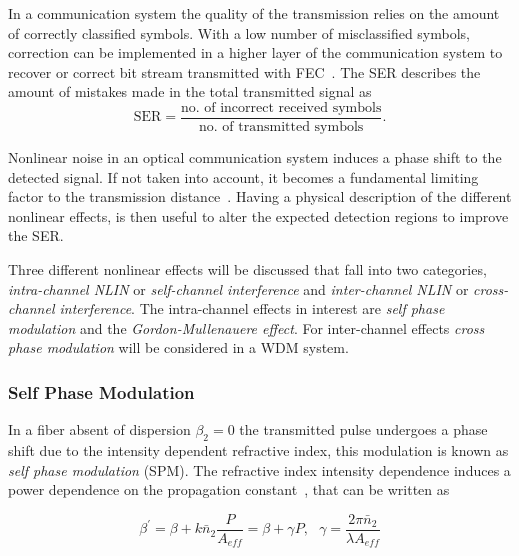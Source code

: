  In a communication system the quality of the transmission relies on the amount of correctly classified symbols. With a low number of misclassified symbols, correction can be implemented in a higher layer of the communication system to recover or correct bit stream transmitted with FEC~\cite{NLPNinCFO}. The SER describes the amount of mistakes made in the total transmitted signal as
 \begin{equation}
\text{SER} = \frac{\text{no. of incorrect received symbols}}{\text{no. of transmitted symbols}}.
\end{equation}

Nonlinear noise in an optical communication system induces a phase shift to the detected signal. If not taken into account, it becomes a fundamental limiting factor to the transmission distance~\cite{NLPNDSP}. Having a physical description of the different nonlinear effects, is then useful to alter the expected detection regions to improve the SER.



 Three different nonlinear effects will be discussed that fall into  two categories, \emph{intra-channel NLIN} or \emph{self-channel interference} and \emph{inter-channel NLIN} or \emph{cross-channel interference}. The intra-channel effects in interest are \emph{self phase modulation } and the \emph{Gordon-Mullenauere effect}. For inter-channel effects \emph{cross phase modulation} will be considered in a WDM system.
  
\subsubsection{Self Phase Modulation}
In a fiber absent of dispersion $\beta_2=0$ the transmitted pulse undergoes a phase shift due to the intensity dependent refractive index, this modulation is known as \textit{self phase modulation }(SPM). The refractive index intensity dependence induces a power dependence on the propagation constant~\cite{FiberAgrawal}, that can be written as~\cite{le2015advanced}  

\begin{equation}
\beta^\prime=\beta+k\bar{n}_2\frac{P}{A_{eff}}=\beta+\gamma P ,\ \ \ \gamma = \frac{2\pi \bar{n}_2}{\lambda A_{eff}}
\label{eq:gammadef}
\end{equation}



